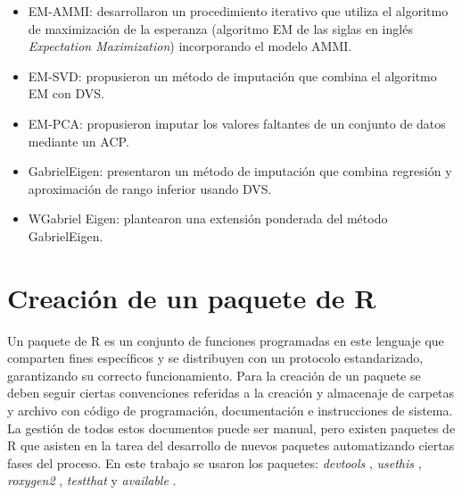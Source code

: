 \begin{itemize}
\item EM-AMMI: \citet{GauchZobel1990} desarrollaron un procedimiento iterativo que utiliza el algoritmo de maximización de la esperanza (algoritmo EM de las siglas en inglés \emph{Expectation Maximization}) incorporando el modelo AMMI. 
\end{itemize}
\begin{itemize}
\item EM-SVD: \citep{Perry2015} propusieron un método de imputación que combina el algoritmo EM con DVS. 
\end{itemize}
\begin{itemize}
\item EM-PCA: \citet{JosseHusson2016} propusieron imputar los valores faltantes de un conjunto de datos mediante un ACP.
\end{itemize}
\begin{itemize}
\item GabrielEigen: \citet{Alarconetal2010} presentaron un método de imputación que combina regresión y aproximación de rango inferior usando DVS. 
\end{itemize}
\begin{itemize}
\item WGabriel Eigen: \citet{Alarconetal2014} plantearon una extensión ponderada del método GabrielEigen.
\end{itemize}


\section{Creación de un paquete de R}


Un paquete de R es un conjunto de funciones programadas en este lenguaje que comparten fines específicos y se distribuyen con un protocolo estandarizado, garantizando su correcto funcionamiento. Para la creación de un paquete se deben seguir ciertas convenciones referidas a la creación y almacenaje de carpetas y archivo con código de programación, documentación e instrucciones de sistema. La gestión de todos estos documentos puede ser manual, pero existen paquetes de R que asisten en la tarea del desarrollo de nuevos paquetes automatizando ciertas fases del proceso. En este trabajo se usaron los paquetes: \emph{devtools} \citep{Wickhametal2021}, \emph{usethis} \citep{WickhamBryan2021}, \emph{roxygen2} \citep{Wickhametal2020}, \emph{testthat} \citep{Wickham2011} y \emph{available} \citep{Ganzetal2019}. 

